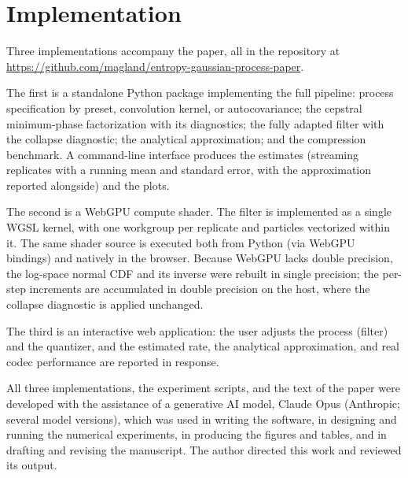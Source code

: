 \documentclass[11pt]{article}
\begin{document}


\section{Implementation}\label{implementation}

Three implementations accompany the paper, all in the repository at \url{https://github.com/magland/entropy-gaussian-process-paper}.

The first is a standalone Python package implementing the full pipeline: process specification by preset, convolution kernel, or autocovariance; the cepstral minimum-phase factorization with its diagnostics; the fully adapted filter with the collapse diagnostic; the analytical approximation; and the compression benchmark. A command-line interface produces the estimates (streaming replicates with a running mean and standard error, with the approximation reported alongside) and the plots.

The second is a WebGPU compute shader. The filter is implemented as a single WGSL kernel, with one workgroup per replicate and particles vectorized within it. The same shader source is executed both from Python (via WebGPU bindings) and natively in the browser. Because WebGPU lacks double precision, the log-space normal CDF and its inverse were rebuilt in single precision; the per-step increments are accumulated in double precision on the host, where the collapse diagnostic is applied unchanged.

The third is an interactive web application: the user adjusts the process (filter) and the quantizer, and the estimated rate, the analytical approximation, and real codec performance are reported in response.

All three implementations, the experiment scripts, and the text of the paper were developed with the assistance of a generative AI model, Claude Opus (Anthropic; several model versions), which was used in writing the software, in designing and running the numerical experiments, in producing the figures and tables, and in drafting and revising the manuscript. The author directed this work and reviewed its output.
\end{document}

